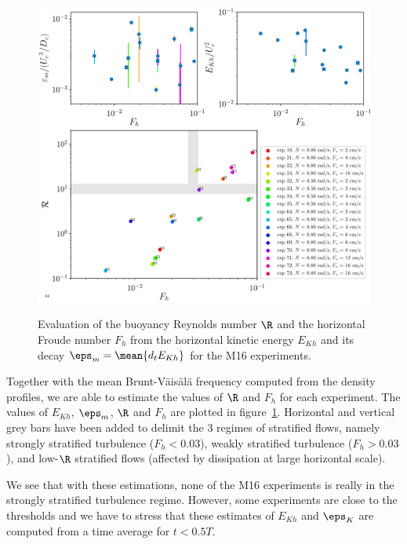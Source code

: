 \begin{figure}
\includegraphics[width=\figwidth]{tmp/fig_R_vs_Fh}
\label{fig:RvsFh}

\caption{Evaluation of the buoyancy Reynolds number $\R$ and the horizontal
Froude number $F_h$ from the horizontal kinetic energy $E_{Kh}$ and its decay
$\eps_m = \mean{d_t E_{Kh}}$ for the M16 experiments.}

\end{figure}

Together with the mean Brunt-V\"ais\"al\"a frequency computed from the density
profiles, we are able to estimate the values of $\R$ and $F_h$ for each
experiment. The values of $E_{Kh}$, $\eps_m$, $\R$ and $F_h$ are plotted in
figure~\ref{fig:RvsFh}. Horizontal and vertical grey bars have been added to
delimit the 3 regimes of stratified flows, namely strongly stratified
turbulence ($F_h < 0.03$), weakly stratified turbulence ($F_h > 0.03$), and
low-$\R$ stratified flows (affected by dissipation at large horizontal scale).

We see that with these estimations, none of the M16 experiments is really in
the strongly stratified turbulence regime. However, some experiments are close to
the thresholds and we have to stress that these estimates of $E_{Kh}$ and
$\eps_K$ are computed from a time average for $t < 0.5 T$.

